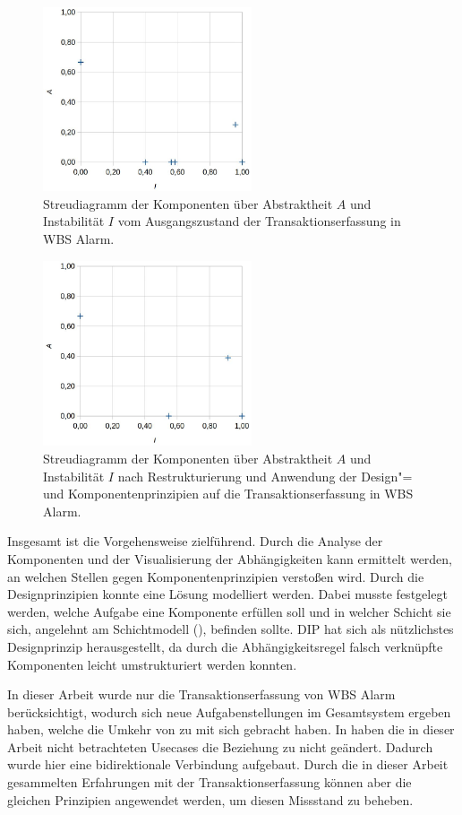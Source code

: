 \begin{figure}
  \centering
  \includegraphics[width=0.55\textwidth]{res/diagramm_ist.jpg}
   \caption{Streudiagramm der Komponenten über Abstraktheit $A$ und Instabilität $I$ vom Ausgangszustand der Transaktionserfassung in WBS Alarm.}
   \label{fig:diagramm_ist}
\end{figure}


\begin{figure}
  \centering
  \includegraphics[width=0.55\textwidth]{res/diagramm_refac.jpg}
   \caption{Streudiagramm der Komponenten über Abstraktheit $A$ und Instabilität $I$ nach Restrukturierung und Anwendung der Design"= und Komponentenprinzipien auf die Transaktionserfassung in WBS Alarm.}
   \label{fig:diagramm_refac}
\end{figure}

Insgesamt ist die Vorgehensweise zielführend. Durch die Analyse der Komponenten und der Visualisierung der Abhängigkeiten kann ermittelt werden, an welchen Stellen gegen Komponentenprinzipien verstoßen wird. Durch die Designprinzipien konnte eine Lösung modelliert werden. Dabei musste festgelegt werden, welche Aufgabe eine Komponente erfüllen soll und in welcher Schicht sie sich, angelehnt am Schichtmodell (), befinden sollte. \ac{DIP} hat sich als nützlichstes Designprinzip herausgestellt, da durch die Abhängigkeitsregel falsch verknüpfte Komponenten leicht umstrukturiert werden konnten.

In dieser Arbeit wurde nur die Transaktionserfassung von WBS Alarm berücksichtigt, wodurch sich neue Aufgabenstellungen im Gesamtsystem ergeben haben, welche die Umkehr von  zu  mit sich gebracht haben. In  haben  die in dieser Arbeit nicht betrachteten Usecases die Beziehung zu  nicht geändert. Dadurch wurde hier eine bidirektionale Verbindung aufgebaut. Durch die in dieser Arbeit gesammelten Erfahrungen mit der Transaktionserfassung können aber die gleichen Prinzipien angewendet werden, um diesen Missstand zu beheben.

